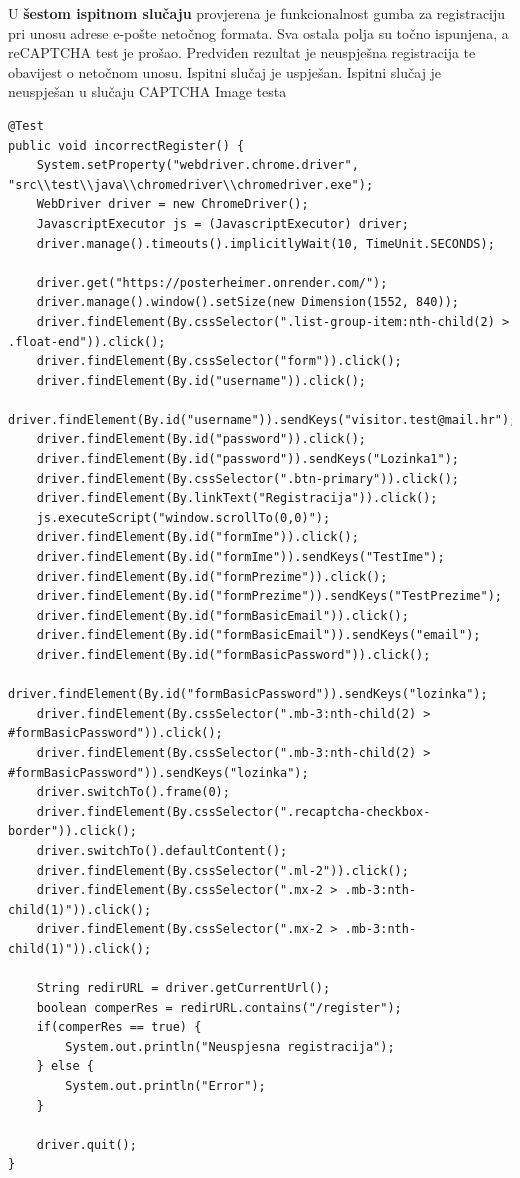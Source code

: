 	U \textbf{šestom ispitnom slučaju} provjerena je funkcionalnost gumba za registraciju pri unosu adrese e-pošte netočnog formata. Sva ostala polja su točno ispunjena, a reCAPTCHA test je prošao. Predviđen rezultat je neuspješna registracija te obavijest o netočnom unosu. Ispitni slučaj je uspješan.
	Ispitni slučaj je neuspješan u slučaju CAPTCHA Image testa 

			\begin{lstlisting}
@Test
public void incorrectRegister() {
	System.setProperty("webdriver.chrome.driver", "src\\test\\java\\chromedriver\\chromedriver.exe");
	WebDriver driver = new ChromeDriver();
	JavascriptExecutor js = (JavascriptExecutor) driver;
	driver.manage().timeouts().implicitlyWait(10, TimeUnit.SECONDS);
	
	driver.get("https://posterheimer.onrender.com/");
	driver.manage().window().setSize(new Dimension(1552, 840));
	driver.findElement(By.cssSelector(".list-group-item:nth-child(2) > .float-end")).click();
	driver.findElement(By.cssSelector("form")).click();
	driver.findElement(By.id("username")).click();
	driver.findElement(By.id("username")).sendKeys("visitor.test@mail.hr");
	driver.findElement(By.id("password")).click();
	driver.findElement(By.id("password")).sendKeys("Lozinka1");
	driver.findElement(By.cssSelector(".btn-primary")).click();
	driver.findElement(By.linkText("Registracija")).click();
	js.executeScript("window.scrollTo(0,0)");
	driver.findElement(By.id("formIme")).click();
	driver.findElement(By.id("formIme")).sendKeys("TestIme");
	driver.findElement(By.id("formPrezime")).click();
	driver.findElement(By.id("formPrezime")).sendKeys("TestPrezime");
	driver.findElement(By.id("formBasicEmail")).click();
	driver.findElement(By.id("formBasicEmail")).sendKeys("email");
	driver.findElement(By.id("formBasicPassword")).click();
	driver.findElement(By.id("formBasicPassword")).sendKeys("lozinka");
	driver.findElement(By.cssSelector(".mb-3:nth-child(2) > #formBasicPassword")).click();
	driver.findElement(By.cssSelector(".mb-3:nth-child(2) > #formBasicPassword")).sendKeys("lozinka");
	driver.switchTo().frame(0);
	driver.findElement(By.cssSelector(".recaptcha-checkbox-border")).click();
	driver.switchTo().defaultContent();
	driver.findElement(By.cssSelector(".ml-2")).click();
	driver.findElement(By.cssSelector(".mx-2 > .mb-3:nth-child(1)")).click();
	driver.findElement(By.cssSelector(".mx-2 > .mb-3:nth-child(1)")).click();
	
	String redirURL = driver.getCurrentUrl();
	boolean comperRes = redirURL.contains("/register");
	if(comperRes == true) {
		System.out.println("Neuspjesna registracija");
	} else {
		System.out.println("Error");
	}
	
	driver.quit();
}	  
			\end{lstlisting}
			
